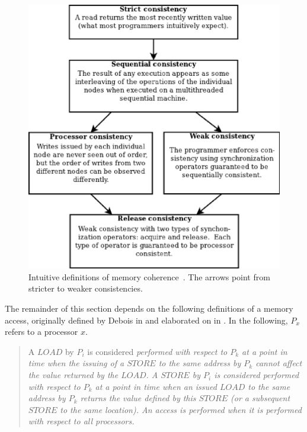 \documentclass[10pt,conference]{IEEEtran}
\begin{document}
\begin{figure}[!h]
\centering
\includegraphics[scale=0.40]{images/memory_consistency.eps}
\caption{Intuitive definitions of memory coherence~\cite{Nitzberg:1991:DSM:112827.112855}.  The arrows point from stricter to weaker consistencies.}
\end{figure}

The remainder of this section depends on the following definitions of a memory access, originally defined by Debois in \cite{Scheurich:1987:CMO:30350.30377, Dubois:1986:MAB:17356.17406} and elaborated on in \cite{Gharachorloo:1990:MCE:325164.325102}.  In the following, $P_x$ refers to a processor $x$.

\begin{quote}
\begin{definition}
A $LOAD$ by $P_i$ is considered \em performed with respect to \em $P_k$ at a point in time when the issuing of a $STORE$ to the same address by $P_k$ cannot affect the value returned by the $LOAD$.  A $STORE$ by $P_i$ is considered \em performed with respect to \em $P_k$ at a point in time when an issued $LOAD$ to the same address by $P_k$ returns the value defined by this $STORE$ (or a subsequent $STORE$ to the same location).  An access is \em performed \em when it is performed with respect to all processors.
\end{definition}
\end{quote}
\hfill \\
\end{document}
